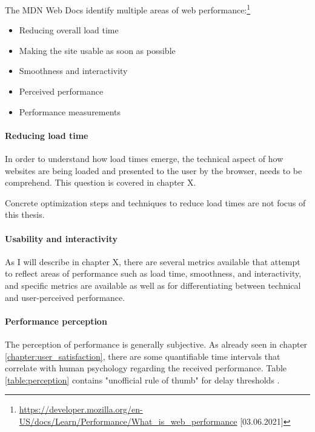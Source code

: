 The MDN Web Docs identify multiple areas of web performance:\footnote{\url{https://developer.mozilla.org/en-US/docs/Learn/Performance/What_is_web_performance} [03.06.2021]}
\begin{itemize}
\item Reducing overall load time
\item Making the site usable as soon as possible
\item Smoothness and interactivity
\item Perceived performance
\item Performance measurements
\end{itemize}

\paragraph{Reducing load time}

In order to understand how load times emerge, the technical aspect of how websites are being loaded and presented to the user by the browser, needs to be comprehend.
This question is covered in chapter X.

Concrete optimization steps and techniques to reduce load times are not focus of this thesis.


\paragraph{Usability and interactivity}

As I will describe in chapter X, there are several metrics available that attempt to reflect areas of performance such as load time, smoothness, and interactivity, and specific metrics are available as well as for differentiating between technical and user-perceived performance.


\paragraph{Performance perception}

The perception of performance is generally subjective.
As already seen in chapter \ref{chapter:user_satisfaction}, there are some quantifiable time intervals that correlate with human psychology regarding the received performance.
Table \ref{table:perception} contains "unofficial rule of thumb" for delay thresholds \cite{2013Grigorik}.

